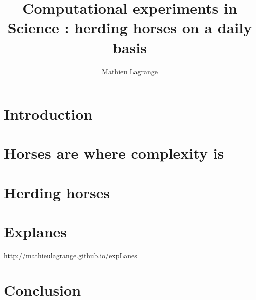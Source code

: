 \documentclass[a4paper,fleqn]{tufte-handout}
\title{Computational experiments in Science : herding horses on a daily basis}
\author{Mathieu Lagrange}
\begin{document}
\maketitle

\section{Introduction}

\section{Horses are where complexity is}

\cite{lagrange:hal-01082501}

\section{Herding horses}

\section{Explanes}

http://mathieulagrange.github.io/expLanes

\section{Conclusion}

  
 
 
  
\end{document}
